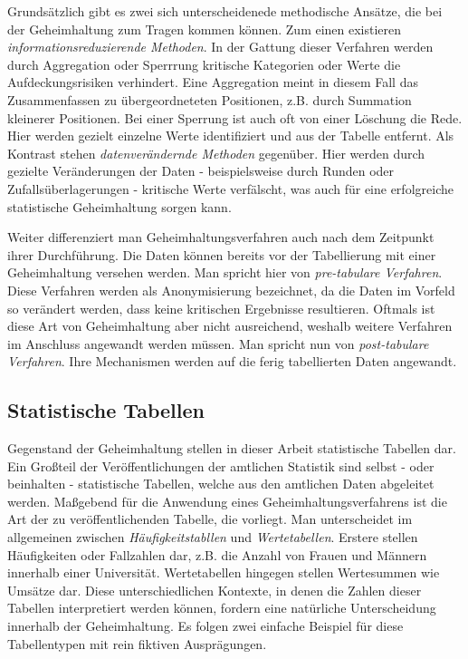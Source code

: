 Grundsätzlich gibt es zwei sich unterscheidenede methodische Ansätze, die bei der Geheimhaltung zum Tragen kommen können. Zum einen existieren \textit{informationsreduzierende Methoden}. In der Gattung dieser Verfahren werden durch Aggregation oder Sperrrung kritische Kategorien oder Werte die Aufdeckungsrisiken verhindert. Eine Aggregation meint in diesem Fall das Zusammenfassen zu übergeordneteten Positionen, z.B. durch Summation kleinerer Positionen. Bei einer Sperrung ist auch oft von einer Löschung die Rede. Hier werden gezielt einzelne Werte identifiziert und aus der Tabelle entfernt. Als Kontrast stehen \textit{datenverändernde Methoden} gegenüber. Hier werden durch gezielte Veränderungen der Daten - beispielsweise durch Runden oder Zufallsüberlagerungen - kritische Werte verfälscht, was auch für eine erfolgreiche statistische Geheimhaltung sorgen kann. 

Weiter differenziert man Geheimhaltungsverfahren auch nach dem Zeitpunkt ihrer Durchführung. Die Daten können bereits vor der Tabellierung mit einer Geheimhaltung versehen werden. Man spricht hier von \textit{pre-tabulare Verfahren}. Diese Verfahren werden als Anonymisierung bezeichnet, da die Daten im Vorfeld so verändert werden, dass keine kritischen Ergebnisse resultieren. Oftmals ist diese Art von Geheimhaltung aber nicht ausreichend, weshalb weitere Verfahren im Anschluss angewandt werden müssen. Man spricht nun von \textit{post-tabulare Verfahren}. Ihre Mechanismen werden auf die ferig tabellierten Daten angewandt.


\subsection{Statistische Tabellen}

Gegenstand der Geheimhaltung stellen in dieser Arbeit statistische Tabellen dar. Ein Gro\ss teil der Veröffentlichungen der amtlichen Statistik sind selbst - oder beinhalten - statistische Tabellen, welche aus den amtlichen Daten abgeleitet werden. Ma\ss gebend für die Anwendung eines Geheimhaltungsverfahrens ist die Art der zu veröffentlichenden Tabelle, die vorliegt. Man unterscheidet im allgemeinen zwischen \textit{Häufigkeitstabllen} und \textit{Wertetabellen}. Erstere stellen Häufigkeiten oder Fallzahlen dar, z.B. die Anzahl von Frauen und Männern innerhalb einer Universität. Wertetabellen hingegen stellen Wertesummen wie Umsätze dar. Diese unterschiedlichen Kontexte, in denen die Zahlen dieser Tabellen interpretiert werden können, fordern eine natürliche Unterscheidung innerhalb der Geheimhaltung. Es folgen zwei einfache Beispiel für diese Tabellentypen mit rein fiktiven Ausprägungen.

